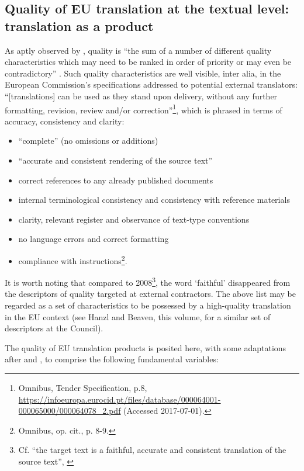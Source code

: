 \documentclass[output=paper]{langsci/langscibook}
\begin{document}
\subsection{Quality of EU translation at the textual level: translation as a product}\label{sec:biel:3.1}

As aptly observed by \citeauthor{Strandvik2015}, quality is “the sum of a number of different quality characteristics which may need to be ranked in order of priority or may even be contradictory” \citeyear[142]{Strandvik2015}. Such quality characteristics are well visible, inter alia, in the European Commission’s specifications addressed to potential external translators: “[translations] can be used as they stand upon delivery, without any further formatting, revision, review and/or correction”\footnote{Omnibus,  Tender Specification, p.8, \url{https://infoeuropa.eurocid.pt/files/database/000064001-000065000/000064078_2.pdf} (Accessed 2017-07-01).}, which is phrased in terms of accuracy, consistency and clarity:

\begin{itemize}
\item 
“complete” (no omissions or additions)
\item 
“accurate and consistent rendering of the source text”
\item 
correct references to any already published documents
\item 
internal terminological consistency and consistency with reference materials
\item 
clarity, relevant register and observance of text-type conventions
\item 
no language errors and correct formatting
\item 
compliance with instructions\footnote{Omnibus, op. cit., p. 8-9.}.
\end{itemize}

It is worth noting that compared to 2008\footnote{Cf. “the target text is a faithful, accurate and consistent translation of the source text”, \citealt[6]{DGT2008}}, the word ‘faithful’ disappeared from the descriptors of quality targeted at external contractors. The above list may be regarded as a set of characteristics to be possessed by a high-quality translation in the EU context (see Hanzl and Beaven, this volume, for a similar set of descriptors at the Council). 

The quality of EU translation products is posited here, with some adaptations after \citet{Chesterman2004} and \citet{Biel2011b, Biel2014}, to comprise the following fundamental variables:
\end{document}
